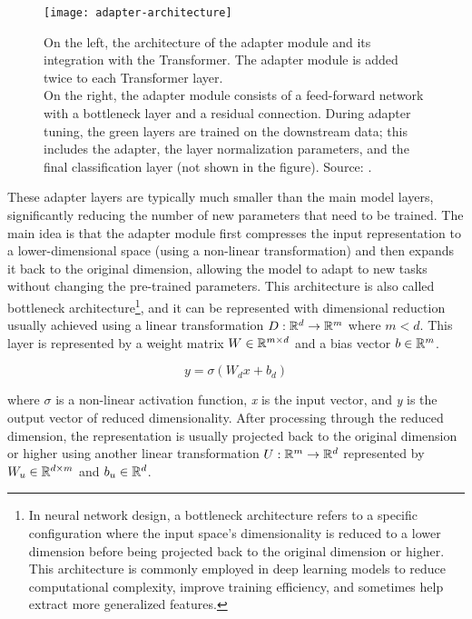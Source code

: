 \begin{figure}[h]
	\centering
	\texttt{[image: adapter-architecture]}
	\caption{On the left, the architecture of the adapter module and its integration with the Transformer. The adapter module is added twice to each Transformer layer.\\
		On the right, the adapter module consists of a feed-forward network with a bottleneck layer and a residual connection. During adapter tuning, the green layers are trained on the downstream data; this includes the adapter, the layer normalization parameters, and the final classification layer (not shown in the figure). Source: \textcite{houlsby2019parameterefficient}.}
	\label{fig:adapter-architecture}
\end{figure}

These adapter layers are typically much smaller than the main model layers, significantly reducing the number of new parameters that need to be trained.
The main idea is that the adapter module first compresses the input representation to a lower-dimensional space (using a non-linear transformation) and then expands it back to the original dimension, allowing the model to adapt to new tasks without changing the pre-trained parameters.
This architecture is also called bottleneck architecture\footnote{
	In neural network design, a bottleneck architecture refers to a specific configuration where the input space's dimensionality is reduced to a lower dimension before being projected back to the original dimension or higher. This architecture is commonly employed in deep learning models to reduce computational complexity, improve training efficiency, and sometimes help extract more generalized features.
}, and it can be represented with dimensional reduction usually achieved using a linear transformation $D: \mathbb{R}^d \rightarrow \mathbb{R}^m$ where $m<d$.
This layer is represented by a weight matrix $W \in \mathbb{R}^{m \times d}$ and a bias vector $b \in \mathbb{R}^m$.

\begin{equation}
	y = \sigma (W_{d}x + b_d)
	\label{eq:adapter-reduction}
\end{equation}

\noindent where $\sigma$ is a non-linear activation function, \textit{x} is the input vector, and \textit{y} is the output vector of reduced dimensionality.
After processing through the reduced dimension, the representation is usually projected back to the original dimension or higher using another linear transformation $U: \mathbb{R}^m \rightarrow \mathbb{R}^d$ represented by $W_u \in \mathbb{R}^{d \times m}$ and $b_u \in \mathbb{R}^d$.

